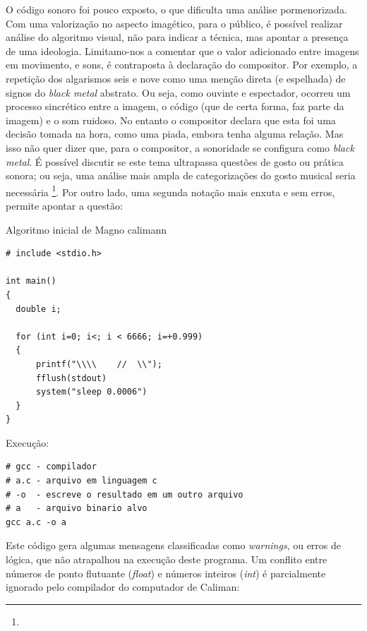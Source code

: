 O código sonoro foi pouco exposto, o que dificulta uma análise pormenorizada. Com uma valorização no aspecto imagético, para o público, é possível realizar análise do algoritmo visual, não para indicar a técnica, mas apontar a presença de uma ideologia. Limitamo-nos a comentar que o valor adicionado entre imagens em movimento, e sons, é contraposta à declaração do compositor. Por exemplo, a repetição dos algarismos seis e nove como uma menção direta (e espelhada) de signos do \emph{black metal} abstrato. Ou seja, como ouvinte e espectador, ocorreu um processo sincrético entre a imagem, o código (que de certa forma, faz parte da imagem) e o som ruidoso. No entanto o compositor declara que esta foi uma decisão tomada na hora, como uma piada, embora tenha alguma relação. Mas isso não quer dizer que, para o compositor, a sonoridade se configura como \emph{black metal}. É possível discutir se este tema ultrapassa questões de gosto ou prática sonora; ou seja, uma análise mais ampla de categorizações do gosto musical seria necessária \footnote{}. Por outro lado, uma segunda notação  mais enxuta e sem erros, permite apontar a questão:

\begin{example}{Algoritmo inicial de Magno calimann}\label{ex:magno}
\begin{verbatim}
# include <stdio.h>

int main()
{
  double i;
  
  for (int i=0; i<; i < 6666; i=+0.999)
  {
      printf("\\\\    //  \\");
      fflush(stdout)
      system("sleep 0.0006")
  }
}
\end{verbatim}

Execução:

\begin{verbatim}
# gcc - compilador
# a.c - arquivo em linguagem c
# -o  - escreve o resultado em um outro arquivo
# a   - arquivo binario alvo
gcc a.c -o a
\end{verbatim}
\end{example}

Este código gera algumas mensagens classificadas como \emph{warnings}, ou erros de lógica, que não atrapalhou na execução deste programa. Um conflito entre números de ponto flutuante (\emph{float}) e números inteiros (\emph{int}) é parcialmente ignorado pelo compilador do computador de Caliman:

